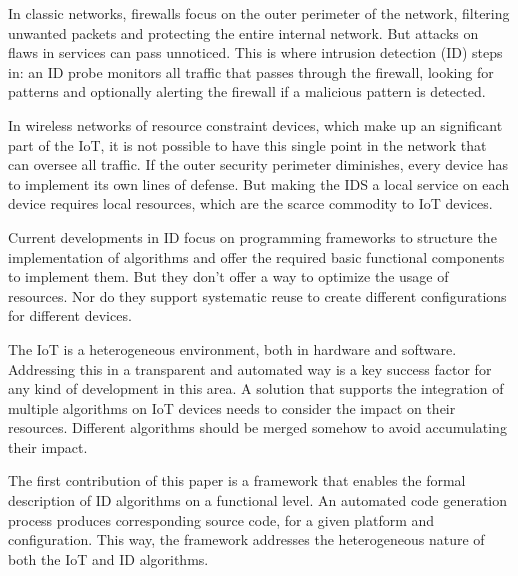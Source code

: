 \documentclass[conference]{IEEEtran}
\begin{document}

In classic networks, firewalls focus on the outer perimeter of the network,
filtering unwanted packets and protecting the entire internal network. But
attacks on flaws in services can pass unnoticed. This is where intrusion
detection (ID) steps in: an ID probe monitors all traffic that passes through
the firewall, looking for patterns and optionally alerting the firewall if a
malicious pattern is detected\cite{denning1987intrusion}.


In wireless networks of resource constraint devices, which make up an
significant part of the IoT, it is not possible to have this single point in
the network that can oversee all traffic\cite{zhang2000intrusion,
mishra2004intrusion}. If the outer security perimeter diminishes, every device
has to implement its own lines of defense. But making the IDS a local service
on each device requires local resources, which are the scarce commodity to IoT
devices.


Current developments in ID focus on programming frameworks to structure the
implementation of algorithms\cite{valero2012di} and offer the required basic
functional components to implement them\cite{krontiris2008lidea}. But they
don't offer a way to optimize the usage of resources. Nor do they support
systematic reuse to create different configurations for different devices.


The IoT is a heterogeneous environment, both in hardware and software.
Addressing this in a transparent and automated way is a key success factor for
any kind of development in this area. A solution that supports the integration
of multiple algorithms on IoT devices needs to consider the impact on their
resources. Different algorithms should be merged somehow to avoid accumulating
their impact.



The first contribution of this paper is a framework that enables the formal
description of ID algorithms on a functional level. An automated code
generation process produces corresponding source code, for a given platform and
configuration. This way, the framework addresses the heterogeneous nature of
both the IoT and ID algorithms.
\end{document}
